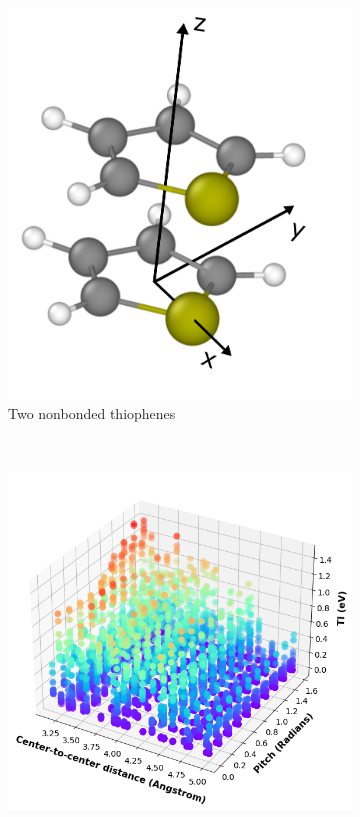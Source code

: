 \begin{figure}[]
\centering
\begin{subfigure}{.4\textwidth}
    \centering
    \includegraphics[width=\textwidth]{figures/thiophene-axes.png}
    \caption{Two nonbonded thiophenes}
\end{subfigure}%
\\
\begin{subfigure}{.8\textwidth}
    \centering
    \includegraphics[width=\textwidth]{figures/transfer_integral_plot.png}

\end{subfigure}
\end{figure}
